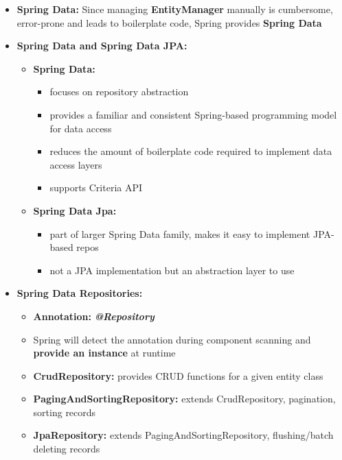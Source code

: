 \documentclass[ieeetran]{article}
\begin{document}
\begin{itemize}
\item \textbf{Spring Data:} Since managing \textbf{EntityManager} manually is cumbersome, error-prone and leads to boilerplate code, Spring provides \textbf{Spring Data}

\pagebreak

\item \textbf{Spring Data and Spring Data JPA:}
	\begin{itemize}
	  \item \textbf{Spring Data:}
		  \begin{itemize}
		    \item focuses on repository abstraction
			    \item provides a familiar and consistent Spring-based programming model for data access
			\item reduces the amount of boilerplate code required to implement data access layers
\item supports Criteria API
		  \end{itemize}
	\item \textbf{Spring Data Jpa:}
		\begin{itemize}
		  \item part of larger Spring Data family, makes it easy to implement JPA-based repos
		\item not a JPA implementation but an abstraction layer to use
		\end{itemize}
	\end{itemize}
\item \textbf{Spring Data Repositories:}
	\begin{itemize}
	  \item \textbf{Annotation:} \textit{\textbf{@Repository}}
	\item Spring will detect the annotation during component scanning and \textbf{provide an instance} at runtime 
	\item \textbf{CrudRepository:} provides CRUD functions for a given entity class
	\item \textbf{PagingAndSortingRepository:} extends CrudRepository, pagination, sorting records
	\item \textbf{JpaRepository:} extends PagingAndSortingRepository, flushing/batch deleting records
	\end{itemize}


\end{itemize}
\end{document}
